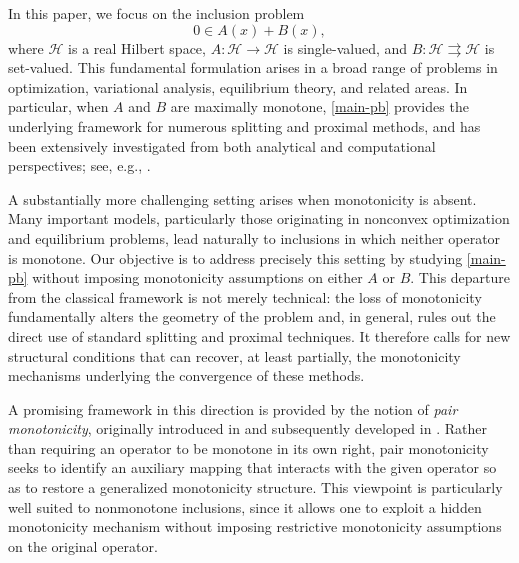 \documentclass[11pt]{article}
\theoremstyle{definition}
\theoremstyle{definition}
\theoremstyle{definition}
\begin{document}
%
In this paper, we focus on the inclusion problem
\begin{equation}\label{main-pb}
0\in A(x)+B(x),
\end{equation}
where $\mathcal{H}$ is a real Hilbert space, $A:\mathcal{H}\to\mathcal{H}$ is single-valued, and $B:\mathcal{H}\rightrightarrows\mathcal{H}$ is set-valued. This fundamental formulation arises in a broad range of problems in optimization, variational analysis, equilibrium theory, and related areas. In particular, when $A$ and $B$ are maximally monotone, \eqref{main-pb} provides the underlying framework for numerous splitting and proximal methods, and has been extensively investigated from both analytical and computational perspectives; see, e.g., \cite{Apidopoulos,Attouch,Bauschke,Bauschke1,Chen,cp,cw,Davis,Gibali,Giselsson,Giselsson1,He,Hong,Lions,Moursi,Svaiter,Tseng}.

A substantially more challenging setting arises when monotonicity is absent. Many important models, particularly those originating in nonconvex optimization and equilibrium problems, lead naturally to inclusions in which neither operator is monotone. Our objective is to address precisely this setting by studying \eqref{main-pb} without imposing monotonicity assumptions on either $A$ or $B$. This departure from the classical framework is not merely technical: the loss of monotonicity fundamentally alters the geometry of the problem and, in general, rules out the direct use of standard splitting and proximal techniques. It therefore calls for new structural conditions that can recover, at least partially, the monotonicity mechanisms underlying the convergence of these methods.

A promising framework in this direction is provided by the notion of \emph{pair monotonicity}, originally introduced in \cite{acl} and subsequently developed in \cite{LDT,LMT}. Rather than requiring an operator to be monotone in its own right, pair monotonicity seeks to identify an auxiliary mapping that interacts with the given operator so as to restore a generalized monotonicity structure. This viewpoint is particularly well suited to nonmonotone inclusions, since it allows one to exploit a hidden monotonicity mechanism without imposing restrictive monotonicity assumptions on the original operator.
\end{document}

